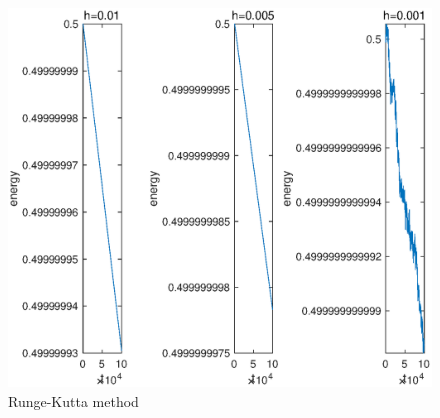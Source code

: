 \documentclass[12pt]{article}%
\begin{document}
\begin{figure}  
\centering  
\includegraphics[scale=0.5]{rk3.eps} 
\caption{Runge-Kutta method}  
\label{rk3}
\end{figure}
 
\end{document}
